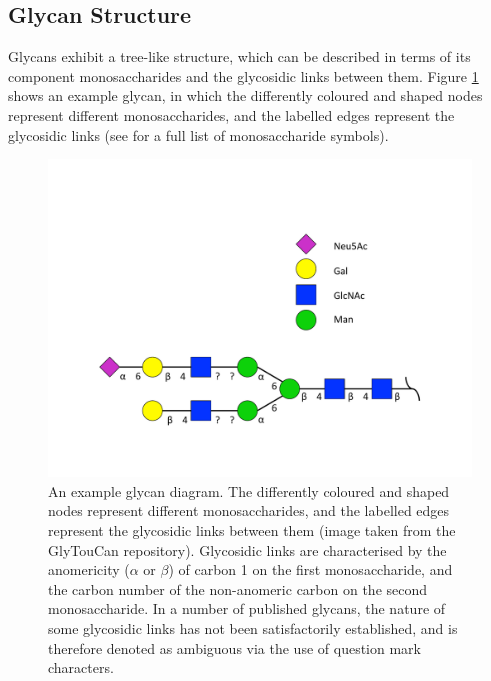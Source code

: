 \documentclass[12pt,a4paper]{article}
\begin{document}
\subsection{Glycan Structure}
\label{sec:glycans_description}
Glycans exhibit a tree-like structure, which can be described in terms of its component monosaccharides and the glycosidic links between them. Figure \ref{fig:example_glycan} shows an example glycan, in which the differently coloured and shaped nodes represent different monosaccharides, and the labelled edges represent the glycosidic links (see  for a full list of monosaccharide symbols).

\begin{figure}[H]
\centering 
\includegraphics[scale=0.6]{images/glycan_G31576LD.pdf} 
\caption{An example glycan diagram. The differently coloured and shaped nodes represent different monosaccharides, and the labelled edges represent the glycosidic links between them (image taken from the GlyTouCan repository\protect\footnotemark). Glycosidic links are characterised by the anomericity ($\alpha$ or $\beta$) of carbon 1 on the first monosaccharide, and the carbon number of the non-anomeric carbon on the second monosaccharide. In a number of published glycans, the nature of some glycosidic links has not been satisfactorily established, and is therefore denoted as ambiguous via the use of question mark characters.}
\label{fig:example_glycan}
\end{figure}

\end{document}
